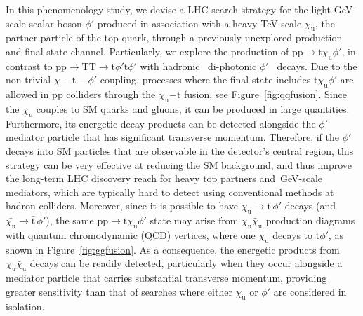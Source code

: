 In this phenomenology study, we devise a LHC search strategy for the light \textrm{GeV}-scale scalar boson $\phi'$ produced in association with a heavy \textrm{TeV}-scale $\chi_\mathrm{u}$, the partner particle of the top quark, through a previously unexplored production and final state channel. Particularly, we explore the production of $\mathrm{pp}\to \mathrm{t}\chi_\mathrm{u} \phi'$, in contrast to $\mathrm{pp}\to \mathrm{T}\mathrm{T}\to \mathrm{t}\phi'\mathrm{t}\phi'$ with hadronic~\parencite{Bhardwaj_2022, Bhardwaj_2022_2, Bardhan_2023} di-photonic $\phi'$~\parencite{Banerjee_2016, Alves_2024} decays. Due to the non-trivial $\chi - \mathrm{t} -\phi'$ coupling, processes where the final state includes $ \mathrm{t}\chi_\mathrm{u} \phi'$ are allowed in \textrm{pp} colliders through the ${\chi_\mathrm{u}}{- \mathrm{t}}$ fusion, see Figure~\ref{fig:qqfusion}. Since the $\chi_\mathrm{u}$ couples to SM quarks and gluons, it can be produced in large quantities. Furthermore, its energetic decay products can be detected alongside the $\phi'$ mediator particle that has significant transverse momentum. Therefore, if the $\phi'$ decays into SM particles that are observable in the detector's central region, this strategy can be very effective at reducing the SM background, and thus improve the long-term LHC discovery reach for heavy top partners and~\textrm{GeV}-scale mediators, which are typically hard to detect using conventional methods at hadron colliders. Moreover, since it is possible to have $\chi_\mathrm{u} \to \mathrm{t}\,\phi'$ decays (and $\bar{\chi_\mathrm{u}} \to \bar{\mathrm{t}}\,\phi'$), the same $\mathrm{pp}\to \mathrm{t}\chi_\mathrm{u} \phi'$ state may arise from $\chi_\mathrm{u}\bar\chi_\mathrm{u}$ production diagrams with quantum chromodynamic (QCD) vertices, where one $\chi_\mathrm{u}$ decays to $\mathrm{t}\phi'$,  as shown in Figure~\ref{fig:ggfusion}. As a consequence, the energetic products from $\chi_\mathrm{u}\bar\chi_\mathrm{u}$ decays can be readily detected, particularly when they occur alongside a mediator particle that carries substantial transverse momentum, providing greater sensitivity than that of searches where either $\chi_\mathrm{u}$ or $\phi'$ are considered in isolation. 

